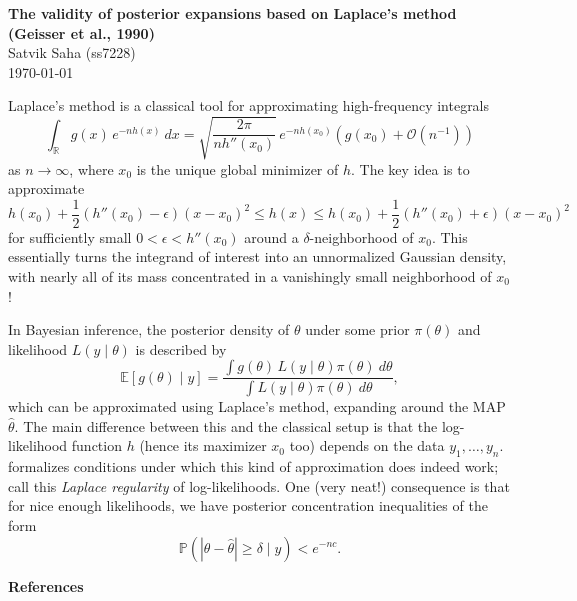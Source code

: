 \documentclass[12pt]{article}
\newcommand{\R}{\mathbb{R}}
\newcommand{\E}{\mathbb{E}}
\renewcommand{\Pr}{\mathbb{P}}
\begin{document}
\begin{flushleft}
\textbf{%
    The validity of posterior expansions based on Laplace’s method (Geisser et al., 1990)
} \\
Satvik Saha (ss7228) \\
\today
\end{flushleft}

\vspace{0.1in}


Laplace's method is a classical tool for approximating high-frequency integrals \[
    \int_\R g(x)\, e^{-n h(x)}\:dx
        = \sqrt{\frac{2\pi}{nh''(x_0)}}\,e^{-nh(x_0)}\left(g(x_0) + \mathcal{O}\left(n^{-1}\right)\right)
\] as $n \to \infty$, where $x_0$ is the unique global minimizer of $h$.
The key idea is to approximate \[
    h(x_0) + \frac{1}{2}(h''(x_0) - \epsilon)(x - x_0)^2
        \leq h(x)
        \leq h(x_0) + \frac{1}{2}(h''(x_0) + \epsilon)(x - x_0)^2
\] for sufficiently small $0 < \epsilon < h''(x_0)$ around a
$\delta$-neighborhood of $x_0$.
This essentially turns the integrand of interest into an unnormalized Gaussian
density, with nearly all of its mass concentrated in a vanishingly small
neighborhood of $x_0$!

In Bayesian inference, the posterior density of $\theta$ under some prior
$\pi(\theta)$ and likelihood $L(y\mid \theta)$ is described by \[
    \E[g(\theta) \mid y] = \frac{\int g(\theta)\, L(y\mid \theta)\pi(\theta) \:d\theta}{\int L(y\mid \theta)\pi(\theta)\:d\theta},
\] which can be approximated using Laplace's method, expanding around the MAP
$\hat{\theta}$.
The main difference between this and the classical setup is that the
log-likelihood function $h$ (hence its maximizer $x_0$ too) depends on the data
$y_1, \dots, y_n$.
\cite{geisser1990} formalizes conditions under which this kind of approximation
does indeed work; call this \emph{Laplace regularity} of log-likelihoods.
One (very neat!) consequence is that for nice enough likelihoods, we have
posterior concentration inequalities of the form \[
    \Pr(|\theta - \hat{\theta}| \geq \delta \mid y) < e^{-nc}.
\]


\vfill

\nocite{*}


\begingroup
\renewcommand{\section}[2]{}%
\textbf{References}

\endgroup
\end{document}
